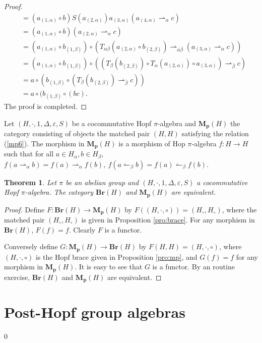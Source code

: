 \documentclass[11pt]{article}
\def\a{\alpha}
\def\b{\beta}
\def\v{\varepsilon}
\newtheorem{theorem}{Theorem}[section]
\begin{document}
\begin{proof}
\begin{align*}
&=(a_{(1,\a)}\circ b)S(a_{(2,\a)})a_{(3,\a)}(a_{(4,\a)}\rightharpoonup_\a c)\\
&=(a_{(1,\a)}\circ b)(a_{(2,\a)}\rightharpoonup_\a c)\\
&=(a_{(1,\a)}\circ b_{(1,\b)})\circ(T_{\a\b}(a_{(2,\a)}\circ b_{(2,\b)})\rightharpoonup_{\bar{\a}\bar{\b}}(a_{(3,\a)}\rightharpoonup_\a c))\\
&=(a_{(1,\a)}\circ b_{(1,\b)})\circ((T_{\b}(b_{(2,\b)})\circ T_{\a}(a_{(2,\a)})\circ a_{(3,\a)})\rightharpoonup_{\bar{\b}} c)\\
&=a\circ (b_{(1,\b)}\circ(T_{\b}(b_{(2,\b)})\rightharpoonup_{\bar{\b}} c))\\
&=a\circ (b_{(1,\b)}\circ(bc).
\end{align*}
The proof is completed.
\end{proof}

Let $(H,\cdot,1,\Delta,\v,S)$ be a cocommutative Hopf $\pi$-algebra and $\mathbf{M_p}(H)$ the category consisting of objects the matched pair $(H,H)$ satisfying the relation (\ref{mp6}). The morphism in $\mathbf{M_p}(H)$ is a morphism of Hop $\pi$-algebra $f:H\rightarrow H$ such that for all $a\in H_\a,b\in H_\b$, $f(a\rightharpoonup_\a b)=f(a)\rightharpoonup_\a f(b),\ f(a\leftharpoonup_\b b)=f(a)\leftharpoonup_\b f(b)$.

\begin{theorem}
Let $\pi$ be an abelian group and $(H,\cdot,1,\Delta,\v,S)$ a cocommutative Hopf $\pi$-algebra. The category $\mathbf{Br}(H)$ and $\mathbf{M_p}(H)$ are equivalent.
\end{theorem}

\begin{proof}
Define $F:\mathbf{Br}(H)\rightarrow \mathbf{M_p}(H)$ by $F((H,\cdot,\circ))=(H_\circ,H_\circ)$, where the matched pair $(H_\circ,H_\circ)$ is given in Proposition \ref{pro:brace}. For any morphism in $\mathbf{Br}(H)$, $F(f)=f$. Clearly $F$ is a functor.

Conversely define $G:\mathbf{M_p}(H)\rightarrow\mathbf{Br}(H)$ by $F(H,H)=(H,\cdot,\circ)$, where $(H,\cdot,\circ)$ is the Hopf brace given in Proposition \ref{pro:mp}, and $G(f)=f$ for any morphism in $\mathbf{M_p}(H)$. It is easy to see that $G$ is a functor. By an routine exercise, $\mathbf{Br}(H)$ and $\mathbf{M_p}(H)$ are equivalent.
\end{proof}

\section{Post-Hopf group algebras}
 \def\theequation{3.\arabic{equation}}
 \setcounter{equation} {0}
\end{document}

